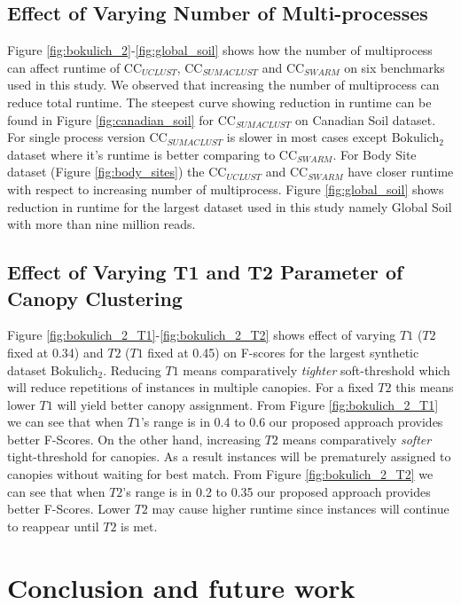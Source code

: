 \documentclass[10pt, conference, compsocconf]{IEEEtran}
\begin{document}
\subsection{\textbf{Effect of Varying Number of Multi-processes}}
Figure \ref{fig:bokulich_2}-\ref{fig:global_soil} shows how the number of multiprocess can affect runtime of CC$_{UCLUST}$, CC$_{SUMACLUST}$ and CC$_{SWARM}$ on six benchmarks used in this study. We observed that increasing the number of multiprocess can reduce total runtime. The steepest curve showing reduction in runtime can be found in Figure \ref{fig:canadian_soil} for CC$_{SUMACLUST}$ on Canadian Soil dataset. For single process version CC$_{SUMACLUST}$ is slower in most cases except Bokulich$_2$ dataset where it's runtime is better comparing to CC$_{SWARM}$. For Body Site dataset (Figure \ref{fig:body_sites}) the CC$_{UCLUST}$ and CC$_{SWARM}$ have closer runtime with respect to increasing number of multiprocess. Figure \ref{fig:global_soil} shows reduction in runtime for the largest dataset used in this study namely Global Soil with more than nine million reads. 

\subsection{\textbf{Effect of Varying T1 and T2 Parameter of Canopy Clustering}}
Figure \ref{fig:bokulich_2_T1}-\ref{fig:bokulich_2_T2} shows effect of varying $T1$ ($T2$ fixed at 0.34) and $T2$ ($T1$ fixed at 0.45) on F-scores for the largest synthetic dataset Bokulich$_2$. Reducing $T1$ means comparatively \textit{tighter} soft-threshold which will reduce repetitions of instances in multiple canopies. For a fixed $T2$ this means lower $T1$ will yield better canopy assignment. From Figure \ref{fig:bokulich_2_T1} we can see that when $T1$'s range is in 0.4 to 0.6 our proposed approach provides better F-Scores. On the other hand, increasing $T2$ means comparatively \textit{softer} tight-threshold for canopies. As a result instances will be prematurely assigned to canopies without waiting for best match. From Figure \ref{fig:bokulich_2_T2} we can see that when $T2$'s range  is in 0.2 to 0.35 our proposed approach provides better F-Scores. Lower $T2$ may cause higher runtime since instances will continue to reappear until $T2$ is met.                   


\section{Conclusion and future work}
\end{document}
